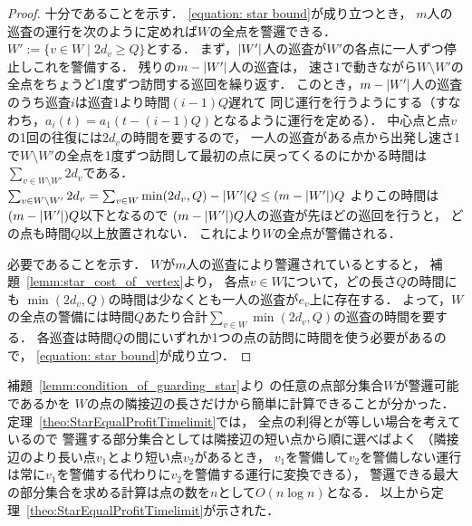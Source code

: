 \begin{proof}
十分であることを示す．
\eqref{equation: star bound}が成り立つとき，
$m$人の巡査の運行を次のように定めれば$W$の全点を警邏できる．
$W' := \{ v \in W \mid 2d_v \geq Q \}$とする．
まず，$\lvert{W'}\rvert$人の巡査が$W'$の各点に一人ずつ停止しこれを警備する．
残りの$m - \lvert{W'}\rvert$人の巡査は，
速さ$1$で動きながら$W \setminus W'$の全点をちょうど1度ずつ訪問する巡回を繰り返す．
このとき，$m - \lvert{W'}\rvert$人の巡査のうち巡査$i$は巡査$1$より時間$(i - 1)Q$遅れて
同じ運行を行うようにする（すなわち，$a_i(t) = a_1(t - (i - 1)Q)$となるように運行を定める）．
中心点と点$v$の1回の往復には$2d_v$の時間を要するので，
一人の巡査がある点から出発し速さ1で$W \setminus W'$の全点を1度ずつ訪問して最初の点に戻ってくるのにかかる時間は$\sum_{v \in W \setminus W'} 2d_v$である．
$\sum_{v \in W \setminus W'} 2d_v
= \sum_{v \in W} \min(2d_v, Q) - |W'|Q
\leq (m - \lvert{W'}\rvert)Q$
よりこの時間は$(m - \lvert{W'}\rvert)Q$以下となるので
$(m - \lvert{W'}\rvert)Q$人の巡査が先ほどの巡回を行うと，
どの点も時間$Q$以上放置されない．
これにより$W$の全点が警備される．

必要であることを示す．
$W$が$m$人の巡査により警邏されているとすると，
補題~\ref{lemm:star_cost_of_vertex}より，
各点$v \in W$について，どの長さ$Q$の時間にも
$\min(2d_v, Q)$の時間は少なくとも一人の巡査が$e_v$上に存在する．
よって，$W$の全点の警備には時間$Q$あたり合計$\sum_{v \in W} \min(2d_v, Q)$の巡査の時間を要する．
各巡査は時間$Q$の間にいずれか1つの点の訪問に時間を使う必要があるので，
\eqref{equation: star bound}が成り立つ．
\end{proof}


補題~\ref{lemm:condition_of_guarding_star}より
{\graphStar}の任意の点部分集合$W$が警邏可能であるかを
$W$の点の隣接辺の長さだけから簡単に計算できることが分かった．
定理~\ref{theo:StarEqualProfitTimelimit}では，
全点の利得と{\maxIdletime}が等しい場合を考えているので
警邏する部分集合としては隣接辺の短い点から順に選べばよく
（隣接辺のより長い点$v_1$とより短い点$v_2$があるとき，
$v_1$を警備して$v_2$を警備しない運行は常に$v_1$を警備する代わりに$v_2$を警備する運行に変換できる），
警邏できる最大の部分集合を求める計算は点の数を$n$として$O(n \log n)$となる．
以上から定理~\ref{theo:StarEqualProfitTimelimit}が示された．
